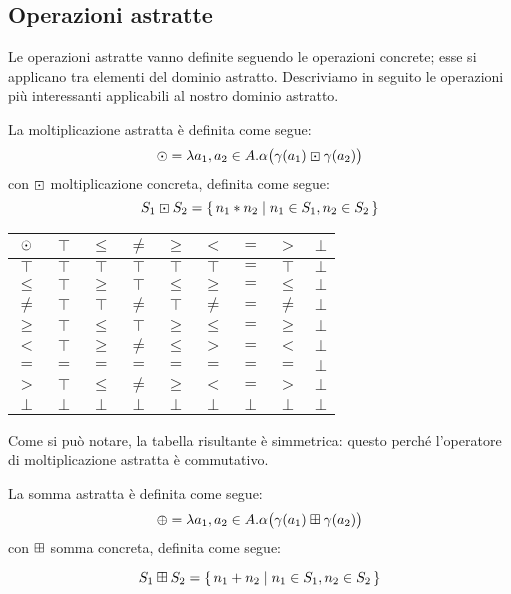 \subsection{Operazioni astratte}
Le operazioni astratte vanno definite seguendo le operazioni concrete;
esse si applicano tra elementi del dominio astratto.
Descriviamo in seguito le operazioni più interessanti applicabili
al nostro dominio astratto.

\begin{definizione}
La moltiplicazione astratta è definita come segue:
\[
	\mathbin{\odot} = \lambda a_1,a_2 \in A . \alpha\bigl(\gamma(a_1) \mathbin{\boxdot} \gamma(a_2)\bigr)
\]
con $\mathbin{\boxdot}$ moltiplicazione concreta, definita come segue:
\[
	S_1 \mathbin{\boxdot} S_2 = \{\, n_1 * n_2 \mid n_1 \in S_1, n_2 \in S_2 \,\}
\]
\end{definizione}

\begin{center}
	\begin{tabular}{ c | c c c c c c c c }
		$\mathbin{\odot}$ & $\top$ & $\leq$ & $\neq$ & $\geq$ & $<$ & $=$ & $>$ & $\bot$ \\
		\hline
		$\top$ & $\top$ & $\top$ & $\top$ & $\top$ & $\top$ & $=$ & $\top$ & $\bot$  \\
		$\leq$ & $\top$ & $\geq$ & $\top$ & $\leq$ & $\geq$ & $=$ & $\leq$ & $\bot$\\
		$\neq$ & $\top$ & $\top$ & $\neq$ & $\top$ & $\neq$ & $=$ & $\neq$ & $\bot$ \\
		$\geq$ & $\top$ & $\leq$ & $\top$ & $\geq$ & $\leq$ & $=$ & $\geq$ & $\bot$ \\
		$<$ & $\top$ & $\geq$ & $\neq$ & $\leq$ & $>$ & $=$ & $<$ & $\bot$ \\
		$=$ & $=$ & $=$ & $=$ & $=$ & $=$ & $=$ & $=$ & $\bot$\\
		$>$ & $\top$ & $\leq$ & $\neq$ & $\geq$ & $<$ & $=$ & $>$ & $\bot$\\
		$\bot$ & $\bot$ & $\bot$ & $\bot$ & $\bot$ & $\bot$ & $\bot$ & $\bot$ & $\bot$ \\
	\end{tabular}
\end{center}

Come si può notare, la tabella risultante è simmetrica:
questo perché l'operatore di moltiplicazione astratta è commutativo.

\begin{definizione}
La somma astratta è definita come segue:
\[
	\mathbin{\oplus} = \lambda a_1,a_2 \in A . \alpha\bigl(\gamma(a_1) \mathbin{\boxplus} \gamma(a_2)\bigr)
\]
con $\mathbin{\boxplus}$ somma concreta, definita come segue:

\[
	S_1 \mathbin{\boxplus} S_2 = \{\, n_1 + n_2 \mid n_1 \in S_1, n_2 \in S_2 \,\}
\]
\end{definizione}

